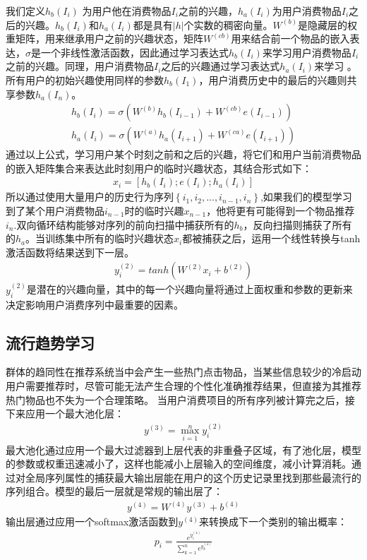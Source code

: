 我们定义$h_{b}(I_{i})$ 为用户他在消费物品$I_i$之前的兴趣，$h_{a}(I_{i})$为用户消费物品$I_i$之后的兴趣。$h_{b}(I_{i})$和$h_{a}(I_{i})$都是具有$|h|$个实数的稠密向量。$W^{(b)}$是隐藏层的权重矩阵，用来继承用户之前的兴趣状态，矩阵$W^{(cb)}$用来结合前一个物品的嵌入表达，$\sigma$是一个非线性激活函数，因此通过学习表达式$h_{b}(I_{i})$来学习用户消费物品$I_i$之前的兴趣。同理，用户消费物品$I_i$之后的兴趣通过学习表达式$h_{a}(I_{i})$来学习
。所有用户的初始兴趣使用同样的参数$h_{b}(I_{1})$，用户消费历史中的最后的兴趣则共享参数$h_{a}(I_{n})$。
\begin{align}
h_{b}(I_{i})=\sigma (W^{(b)}h_{b}(I_{i-1})+W^{(cb)}e(I_{i-1})) \\
h_{a}(I_{i})=\sigma (W^{(a)}h_{a}(I_{i+1})+W^{(ca)}e(I_{i+1}))
\end{align}
通过以上公式，学习用户某个时刻之前和之后的兴趣，将它们和用户当前消费物品的嵌入矩阵集合来表达此时刻用户的临时兴趣状态，其结合形式如下：
\begin{align}
x_{i}=[h_{b}(I_{i});e(I_{i});h_{a}(I_{i})]
\end{align}
所以通过使用大量用户的历史行为序列$\left \{ i_{1},i_{2},...,i_{n-1},i_{n} \right \}$,如果我们的模型学习到了某个用户消费物品$i_{n-1}$时的临时兴趣$x_{n-1}$，他将更有可能得到一个物品推荐$i_{n}$.双向循环结构能够对序列的前向扫描中捕获所有的$h_b$，反向扫描则捕获了所有的$h_a$。当训练集中所有的临时兴趣状态$x_i$都被捕获之后，运用一个线性转换与tanh激活函数将结果送到下一层。
\begin{align}
y_{i}^{(2)}=tanh(W^{(2)}x_{i}+b^{(2)})
\end{align}
$y_{i}^{(2)}$是潜在的兴趣向量，其中的每一个兴趣向量将通过上面权重和参数的更新来决定影响用户消费序列中最重要的因素。
\subsection{流行趋势学习}
群体的趋同性在推荐系统当中会产生一些热门点击物品，当某些信息较少的冷启动用户需要推荐时，尽管可能无法产生合理的个性化准确推荐结果，但直接为其推荐热门物品也不失为一个合理策略。
当用户消费项目的所有序列被计算完之后，接下来应用一个最大池化层：
\begin{align}
y^{(3)}=\max_{i=1}^{n}y_{i}^{(2)}
\end{align}
最大池化通过应用一个最大过滤器到上层代表的非重叠子区域，有了池化层，模型的参数或权重迅速减小了，这样也能减小上层输入的空间维度，减小计算消耗。通过对全局序列属性的捕获最大输出层能在用户的这个历史记录里找到那些最流行的序列组合。模型的最后一层就是常规的输出层了：
\begin{align}
y^{(4)}=W^{(4)}y^{(3)}+b^{(4)}
\end{align}
输出层通过应用一个softmax激活函数到$y^{(4)}$来转换成下一个类别的输出概率：
\begin{align}
p_{i}= \frac{e^{y_{i}^{(4)}}}{\sum_{k=1}^{n}e^{y_{k}^{(4)}}}
\end{align}
